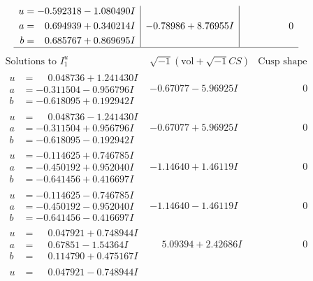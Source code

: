 \documentclass[1p]{elsarticle_modified}
\theoremstyle{definition}
\newcommand{\I}{\sqrt{-1}}
\begin{document}
$$\begin{array}{c|c|c}
\begin{aligned}
u &= -0.592318 - 1.080490 I \\
a &= \phantom{-}0.694939 + 0.340214 I \\
b &= \phantom{-}0.685767 + 0.869695 I\end{aligned}
 & -0.78986 + 8.76955 I & \phantom{-0.000000 } 0\\
 \hline 
 \end{array}$$\newpage$$\begin{array}{c|c|c}  
\text{Solutions to }I^u_{1}& \I (\text{vol} + \sqrt{-1}CS) & \text{Cusp shape}\\
 \hline 
\begin{aligned}
u &= \phantom{-}0.048736 + 1.241430 I \\
a &= -0.311504 - 0.956796 I \\
b &= -0.618095 + 0.192942 I\end{aligned}
 & -0.67077 - 5.96925 I & \phantom{-0.000000 } 0 \\ \hline\begin{aligned}
u &= \phantom{-}0.048736 - 1.241430 I \\
a &= -0.311504 + 0.956796 I \\
b &= -0.618095 - 0.192942 I\end{aligned}
 & -0.67077 + 5.96925 I & \phantom{-0.000000 } 0 \\ \hline\begin{aligned}
u &= -0.114625 + 0.746785 I \\
a &= -0.450192 + 0.952040 I \\
b &= -0.641456 + 0.416697 I\end{aligned}
 & -1.14640 + 1.46119 I & \phantom{-0.000000 } 0 \\ \hline\begin{aligned}
u &= -0.114625 - 0.746785 I \\
a &= -0.450192 - 0.952040 I \\
b &= -0.641456 - 0.416697 I\end{aligned}
 & -1.14640 - 1.46119 I & \phantom{-0.000000 } 0 \\ \hline\begin{aligned}
u &= \phantom{-}0.047921 + 0.748944 I \\
a &= \phantom{-}0.67851 - 1.54364 I \\
b &= \phantom{-}0.114790 + 0.475167 I\end{aligned}
 & \phantom{-}5.09394 + 2.42686 I & \phantom{-0.000000 } 0 \\ \hline\begin{aligned}
u &= \phantom{-}0.047921 - 0.748944 I \\

\end{aligned}
\end{array}$$
\end{document}
